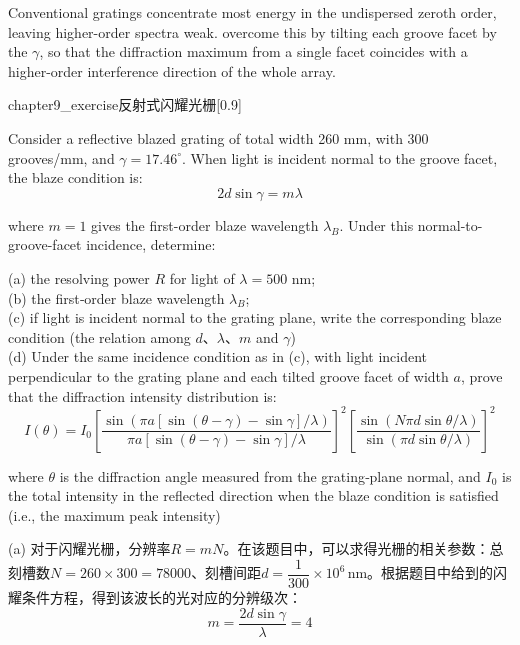 \begin{solution}
    Conventional gratings concentrate most energy in the undispersed zeroth order, leaving higher-order spectra weak.  overcome this by tilting each groove facet by the  $\gamma$, so that the diffraction maximum from a single facet coincides with a higher-order interference direction of the whole array.

    \begin{singlefigure}{chapter9_exercise反射式闪耀光栅}[0.9]
    \end{singlefigure}

    Consider a reflective blazed grating of total width 260 mm, with 300 grooves/mm, and $\gamma = 17.46^\circ$. When light is incident normal to the groove facet, the blaze condition is:
    \[2d \sin\gamma = m \lambda\]

    where $m = 1$ gives the first-order blaze wavelength $\lambda_B$. Under this normal-to-groove-facet incidence, determine:

    (a) the resolving power $R$ for light of $\lambda = 500$ nm;\\
    (b) the first‑order blaze wavelength $\lambda_B$;\\
    (c) if light is incident normal to the grating plane, write the corresponding blaze condition (the relation among $d$、$\lambda$、$m$ and $\gamma$)\\
    (d) Under the same incidence condition as in (c), with light incident perpendicular to the grating plane and each tilted groove facet of width $a$, prove that the diffraction intensity distribution is:
    \[I(\theta) = I_0 \left[ \frac{\sin( \pi a [\sin(\theta-\gamma) - \sin\gamma]/\lambda)}{\pi a [\sin(\theta-\gamma) - \sin\gamma]/\lambda} \right]^2 \left[ \frac{\sin( N \pi d \sin\theta /\lambda)}{\sin(\pi d \sin\theta /\lambda)} \right]^2\]

    where $\theta$ is the diffraction angle measured from the grating‑plane normal, and $I_0$ is the total intensity in the reflected direction when the blaze condition is satisfied (i.e., the maximum peak intensity)
    \tcbrule

    (a) 对于闪耀光栅，分辨率$R = mN$。在该题目中，可以求得光栅的相关参数：总刻槽数$N = 260\times 300 = 78000$、刻槽间距$d = \dfrac{1}{300}\times 10^6\,\text{nm}$。根据题目中给到的闪耀条件方程，得到该波长的光对应的分辨级次：
    \[m = \dfrac{2d\sin\gamma}{\lambda} = 4\]


\end{solution}
